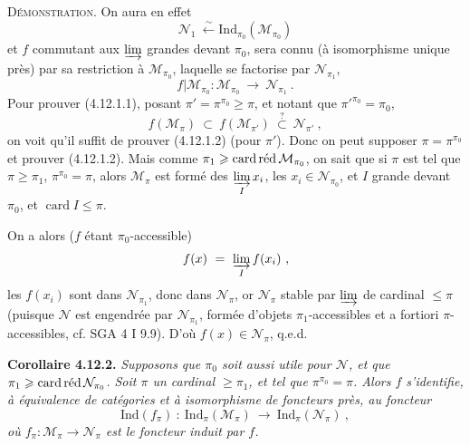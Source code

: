 \documentclass[11pt]{article}
\newcommand{\printedpage}[1]{\marginpar{\footnotesize p.~#1}}
\newcommand{\msp}[1]{\marginpar{\footnotesize [#1]}}
\newcommand{\Ind}{\mathrm{Ind}}
\newcommand{\cardred}{\mathop{\textup{card\,réd}}\nolimits}
\begin{document}
\textsc{Démonstration}. On aura en effet
\[
\mathcal{N}_1 \ \xleftarrow{\ \sim\ } \Ind_{\pi_0}(\mathcal{M}_{\pi_0})
\]
et $f$ commutant aux $\varinjlim$ grandes devant $\pi_0$, sera connu (à isomorphisme unique près) par sa restriction à $\mathcal{M}_{\pi_0}$, laquelle se factorise par $\mathcal{N}_{\pi_1}$,
\[
f|\mathcal{M}_{\pi_0} : \mathcal{M}_{\pi_0} \ \longrightarrow \ \mathcal{N}_{\pi_1} \ .
\]
Pour prouver (4.12.1.1), posant $\pi' = \pi^{\pi_0} \geqslant \pi$, et notant que $\pi'^{\pi_0} = \pi_0$,
\[
f(\mathcal{M}_\pi) \ \subset \ f(\mathcal{M}_{\pi'}) \ \overset{?}{\subset} \ \mathcal{N}_{\pi'} \ ,
\]
\printedpage{103}
on voit qu'il suffit de prouver (4.12.1.2) (pour $\pi'$). Donc on peut supposer $\pi = \pi^{\pi_0}$ et prouver (4.12.1.2). Mais comme $\pi_1 \geqslant \cardred \mathcal{M}_{\pi_0}$, on sait que si $\pi$ est tel que $\pi \geqslant \pi_1$, $\pi^{\pi_0} = \pi$, alors $\mathcal{M}_\pi$ est formé des $\varinjlim\limits_{I} x_i$, les $x_i \in \mathcal{N}_{\pi_0}$, et $I$ grande devant $\pi_0$, et $\operatorname{card} I \leqslant \pi$.

\msp{page 275}

On a alors ($f$ étant $\pi_0$-accessible)
\[
f(x) \ = \ \varinjlim_{I} f(x_i) \ ,
\]
les $f(x_i)$ sont dans $\mathcal{N}_{\pi_1}$, donc dans $\mathcal{N}_\pi$, or $\mathcal{N}_\pi$ stable par $\varinjlim$ de cardinal $\leqslant \pi$ (puisque $\mathcal{N}$ est engendrée par $\mathcal{N}_{\pi_1}$, formée d'objets $\pi_1$-accessibles et a fortiori $\pi$-accessibles, cf. SGA 4 I 9.9). D'où $f(x) \in \mathcal{N}_\pi$, q.e.d.

\textbf{Corollaire 4.12.2.} \textit{Supposons que $\pi_0$ soit aussi utile pour $\mathcal{N}$, et que $\pi_1 \geqslant \cardred \mathcal{N}_{\pi_0}$. Soit $\pi$ un cardinal $\geqslant \pi_1$, et tel que $\pi^{\pi_0} = \pi$. Alors $f$ s'identifie, à équivalence de catégories et à isomorphisme de foncteurs près, au foncteur}
\[
\Ind(f_\pi) \ : \ \Ind_\pi(\mathcal{M}_\pi) \ \longrightarrow \ \Ind_\pi(\mathcal{N}_\pi) \ ,
\]
\textit{où $f_\pi : \mathcal{M}_\pi \longrightarrow \mathcal{N}_\pi$ est le foncteur induit par $f$.}
\end{document}
